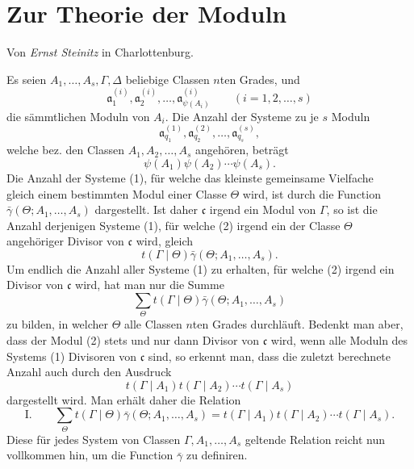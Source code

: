 \documentclass[11pt,a4paper]{article}
\begin{document}
\section*{Zur Theorie der Moduln}
\begin{center}Von \emph{Ernst Steinitz} in Charlottenburg.\end{center}

Es seien $A_1,\ldots,A_s,\Gamma,\Delta$ beliebige Classen $n$ten Grades, und
\[
 \mathfrak a^{(i)}_1,\mathfrak a^{(i)}_2,\ldots,
 \mathfrak a^{(i)}_{\psi(A_i)}\qquad (i=1,2,\ldots,s)
\]
die sämmtlichen Moduln von $A_i$. Die Anzahl der Systeme zu je $s$ Moduln
\begin{equation}
 \mathfrak a^{(1)}_{q_1},\mathfrak a^{(2)}_{q_2},\ldots,
 \mathfrak a^{(s)}_{q_s},
\tag{1}
\end{equation}
welche bez. den Classen $A_1,A_2,\ldots,A_s$ angehören, beträgt
\[
 \psi(A_1)\psi(A_2)\cdots\psi(A_s).
\]
Die Anzahl der Systeme (1), für welche das kleinste gemeinsame Vielfache
\begin{equation}
 [\mathfrak a^{(1)}_{q_1},\mathfrak a^{(2)}_{q_2},\ldots,
 \mathfrak a^{(s)}_{q_s}]
\tag{2}
\end{equation}
gleich einem bestimmten Modul einer Classe $\Theta$ wird, ist durch die Function
$\bar\gamma(\Theta;A_1,\ldots,A_s)$ dargestellt. Ist daher $\mathfrak c$ irgend ein Modul von $\Gamma$, so ist die Anzahl derjenigen Systeme (1), für welche (2) irgend ein der Classe $\Theta$ angehöriger Divisor von $\mathfrak c$ wird, gleich
\[
 t(\Gamma\mid\Theta)\bar\gamma(\Theta;A_1,\ldots,A_s).
\]
Um endlich die Anzahl aller Systeme (1) zu erhalten, für welche (2) irgend ein Divisor von $\mathfrak c$ wird, hat man nur die Summe
\[
 \sum_{\Theta}t(\Gamma\mid\Theta)\bar\gamma(\Theta;A_1,\ldots,A_s)
\]
zu bilden, in welcher $\Theta$ alle Classen $n$ten Grades durchläuft. Bedenkt man aber, dass der Modul (2) stets und nur dann Divisor von $\mathfrak c$ wird, wenn alle Moduln des Systems (1) Divisoren von $\mathfrak c$ sind, so erkennt man, dass die zuletzt berechnete Anzahl auch durch den Ausdruck
\[
 t(\Gamma\mid A_1)t(\Gamma\mid A_2)\cdots t(\Gamma\mid A_s)
\]
dargestellt wird. Man erhält daher die Relation
\[
\text{I.}\qquad
 \sum_{\Theta}t(\Gamma\mid\Theta)\bar\gamma(\Theta;A_1,\ldots,A_s)
 =t(\Gamma\mid A_1)t(\Gamma\mid A_2)\cdots t(\Gamma\mid A_s).
\]
Diese für jedes System von Classen $\Gamma,A_1,\ldots,A_s$ geltende Relation reicht nun vollkommen hin, um die Function $\bar\gamma$ zu definiren.
\end{document}
